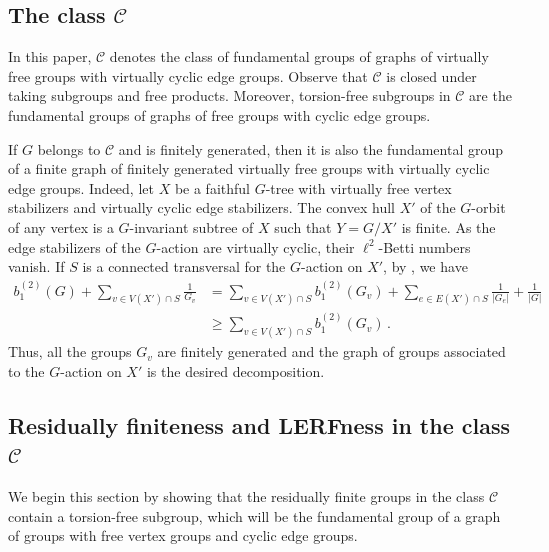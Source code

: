\documentclass[a4paper]{amsart}
\theoremstyle{definition}
\theoremstyle{remark}
\begin{document}
\subsection{The class \texorpdfstring{\(\mathcal{C}\)}{C}}

In this paper, \(\mathcal{C}\) denotes the class of fundamental groups of graphs of virtually free groups with virtually cyclic edge groups. Observe that \(\mathcal{C}\) is closed under taking subgroups and free products. Moreover, torsion-free subgroups in \(\mathcal{C}\) are the fundamental groups of graphs of free groups with cyclic edge groups.

If \(G\) belongs to \(\mathcal{C}\) and is finitely generated, then it is also the fundamental group of a finite graph of finitely generated virtually free groups with virtually cyclic edge groups. Indeed, let \(X\) be a faithful \(G\)-tree with virtually free vertex stabilizers and virtually cyclic edge stabilizers. The convex hull \(X'\) of the \(G\)-orbit of any vertex is a \(G\)-invariant subtree of \(X\) such that \(Y = G/ X'\) is finite. As the edge stabilizers of the \(G\)-action are virtually cyclic, their \(\ell^2\)-Betti numbers vanish. If \(S\) is a connected transversal for the \(G\)-action on \(X'\), by \cite[Thm. 1.5]{Chatterji2021}, we have \begin{align*}b_1^{(2)}(G) + \sum_{v \in V(X')\cap S} \frac{1}{G_v} &= \sum_{v \in V(X')\cap S} b_1^{(2)}(G_v) + \sum_{e \in E(X')\cap S} \frac{1}{|G_e|} + \frac{1}{|G|}\\&\geq \sum_{v \in V(X')\cap S} b_1^{(2)}(G_v)\,. \end{align*}
Thus, all the groups \(G_v\) are finitely generated and the graph of groups associated to the \(G\)-action on \(X'\) is the desired decomposition.

\subsection{Residually finiteness and LERFness in the class \texorpdfstring{\(\mathcal{C}\)}{C}}

We begin this section by showing that the residually finite groups in the class \(\mathcal{C}\) contain a torsion-free subgroup, which will be the fundamental group of a graph of groups with free vertex groups and cyclic edge groups.
\end{document}
